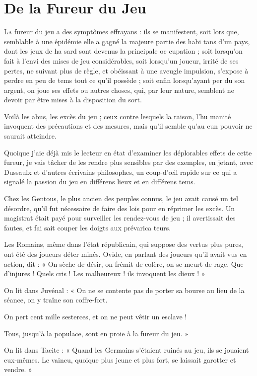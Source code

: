 \chapter{De la Fureur du Jeu}

\lettrine{L}{a} fureur du jeu a des symptômes
effrayans : ils se manifestent, soit lors%
que, semblable à une épidémie elle
a gagné la majeure partie des habi%
tans d'un pays, dont les jeux de ha%
sard sont devenus la principale oc%
cupation ; soit lorsqu'on fait à l'envi
des mises de jeu considérables, soit
lorsqu'un joueur, irrité de ses pertes,
ne suivant plus de règle, et obéissant
à une aveugle impulsion, s'expose à
perdre en peu de tems tout ce qu'il
possède ; soit enfin lorsqu'ayant per%
du son argent, on joue ses effets ou
autres choses, qui, par leur nature,
semblent ne devoir par être mises à la
disposition du sort.

Voilà les abus, les excès du jeu ;
ceux contre lesquels la raison, l'hu%
manité invoquent des précautions et
des mesures, mais qu'il semble qu'au%
cun pouvoir ne saurait atteindre.

Quoique j'aie déjà mis le lecteur
en état d'examiner les déplorables
effets de cette fureur, je vais tâcher
de les rendre plus sensibles par des
exemples, en jetant, avec Dussaulx
et d'autres écrivains philosophes, un
coup-d'œil rapide sur ce qui a signalé
la passion du jeu en différens lieux
et en différens tems.

Chez les Gentous, le plus ancien
des peuples connus, le jeu avait causé
un tel désordre, qu'il fut nécessaire
de faire des lois pour en réprimer
les excès. Un magistrat était payé
pour surveiller les rendez-vous de
jeu ; il avertissait des fautes, et fai%
sait couper les doigts aux prévarica%
teurs.

Les Romains, même dans l'état
républicain, qui suppose des vertus
plus pures, ont été des joueurs déter%
minés. Ovide, en parlant des joueurs
qu'il avait vus en action, dit : « On
sèche de désir, on frémit de colère,
on se meurt de rage. Que d'injures !
Quels cris ! Les malheureux ! ils
invoquent les dieux ! »

On lit dans Juvénal : « On ne se
contente pas de porter sa bourse
au lieu de la séance, on y traîne
son coffre-fort.

On pert cent mille sesterces, et
on ne peut vêtir un esclave !

Tous, jusqu'à la populace, sont
en proie à la fureur du jeu. »

On lit dans Tacite : « Quand les
Germains s'étaient ruinés au jeu,
ils se jouaient eux-mêmes. Le
vaincu, quoique plus jeune et plus
fort, se laissait garotter et vendre. »

